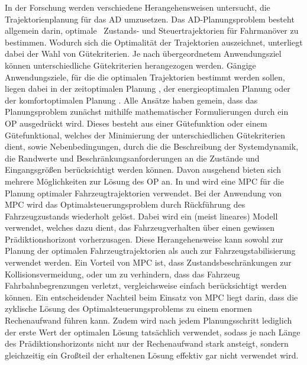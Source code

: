 In der Forschung werden verschiedene Herangehensweisen untersucht, die Trajektorienplanung für das \gls{AD} umzusetzen. Das \gls{AD}-Planungsproblem besteht allgemein darin, \glqq optimale\grqq~ Zustands- und Steuertrajektorien für Fahrmanöver zu bestimmen. Wodurch sich die Optimalität der Trajektorien auszeichnet, unterliegt dabei der Wahl von Gütekriterien. Je nach übergeordnetem Anwendungsziel können unterschiedliche Gütekriterien herangezogen werden. Gängige Anwendungsziele, für die die optimalen Trajektorien bestimmt werden sollen, liegen dabei in der zeitoptimalen Planung \cite{Christ.2021}, der energieoptimalen Planung \cite{energyoptimal} oder der komfortoptimalen Planung \cite{Rathgeber.2016,Werling.2011}. Alle Ansätze haben gemein, dass das Planungsproblem zunächst mithilfe mathematischer Formulierungen durch ein \gls{OP} ausgedrückt wird. Dieses besteht aus einer Gütefunktion oder einem Gütefunktional, welches der Minimierung der unterschiedlichen Gütekriterien dient, sowie Nebenbedingungen, durch die die Beschreibung der Systemdynamik, die Randwerte und Beschränkungsanforderungen an die Zustände und Eingangsgrößen berücksichtigt werden können. Davon ausgehend bieten sich mehrere Möglichkeiten zur Lösung des \gls{OP} an. In \cite{shi} und \cite{guo} wird eine \gls{MPC} für die Planung optimaler Fahrzeugtrajektorien verwendet. Bei der Anwendung von \gls{MPC} wird das Optimalsteuerungsproblem durch Rückführung des Fahrzeugzustands wiederholt gelöst. Dabei wird ein (meist lineares) Modell verwendet, welches dazu dient, das Fahrzeugverhalten über einen gewissen Prädiktionshorizont vorherzusagen. Diese Herangehensweise kann sowohl zur Planung der optimalen Fahrzeugtrajektorien als auch zur Fahrzeugstabilisierung verwendet werden. Ein Vorteil von \gls{MPC} ist, dass Zustandsbeschränkungen zur Kollisionsvermeidung, oder um zu verhindern, dass das Fahrzeug Fahrbahnbegrenzungen verletzt, vergleichsweise einfach berücksichtigt werden können. Ein entscheidender Nachteil beim Einsatz von \gls{MPC} liegt darin, dass die zyklische Lösung des Optimalsteuerungsproblems zu einem enormen Rechenaufwand führen kann. Zudem wird nach jedem Planungsschritt lediglich der erste Wert der optimalen Lösung tatsächlich verwendet, sodass je nach Länge des Prädiktionshorizonts nicht nur der Rechenaufwand stark ansteigt, sondern gleichzeitig ein Großteil der erhaltenen Lösung effektiv gar nicht verwendet wird.  

